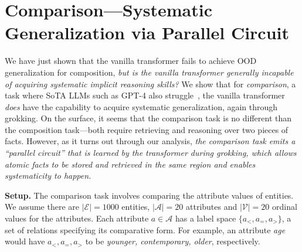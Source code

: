\section{Comparison---Systematic Generalization via Parallel Circuit}
\label{sec:comparison}
We have just shown that the vanilla transformer fails to achieve OOD generalization for composition, \textit{but is the vanilla transformer generally incapable of acquiring systematic implicit reasoning skills?} We show that for \textit{comparison}, a task where SoTA LLMs such as GPT-4 also struggle~\citep{allenzhu2023physics}, the vanilla transformer \textit{does} have the capability to acquire systematic generalization, again through grokking. On the surface, it seems that the comparison task is no different than the composition task---both require retrieving and reasoning over two pieces of facts. However, as it turns out through our analysis, \textit{the comparison task emits a ``parallel circuit'' that is learned by the transformer during grokking, which allows atomic facts to be stored and retrieved in the same region and enables systematicity to happen.}

\noindent\textbf{Setup.} The comparison task involves comparing the attribute values of entities. We assume there are $|\mathcal{E}|=1000$ entities, $|\mathcal{A}|=20$ attributes and $|\mathcal{V}|=20$ ordinal values for the attributes. Each attribute $a\in \mathcal{A}$ has a label space $\{a_<, a_=, a_>\}$, a set of relations specifying its comparative form. For example, an attribute \textit{age} would have $a_<, a_=, a_>$ to be \textit{younger, contemporary, older}, respectively.


